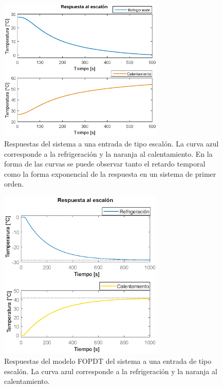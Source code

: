 \begin{figure}[h!]
\begin{centering}
  \includegraphics[width=0.7\textwidth]{Images/plant_response.eps}
    \caption{Respuestas del sistema a una entrada de tipo escalón. La curva azul corresponde a la  refrigeración y la naranja al calentamiento. En la forma de las curvas se puede observar tanto el retardo temporal como la forma exponencial de la respuesta en un sistema de primer orden.}
    \label{fig:step_response}
  \par\end{centering}
\end{figure}
\begin{figure}[h!]
\begin{centering}
  \includegraphics[width=0.7\textwidth]{Images/step}
    \caption{Respuestas del modelo FOPDT del sistema a una entrada de tipo escalón. La curva azul corresponde a la  refrigeración y la naranja al calentamiento.}
    \label{fig:step_model_plant}
  \par\end{centering}
\end{figure}
